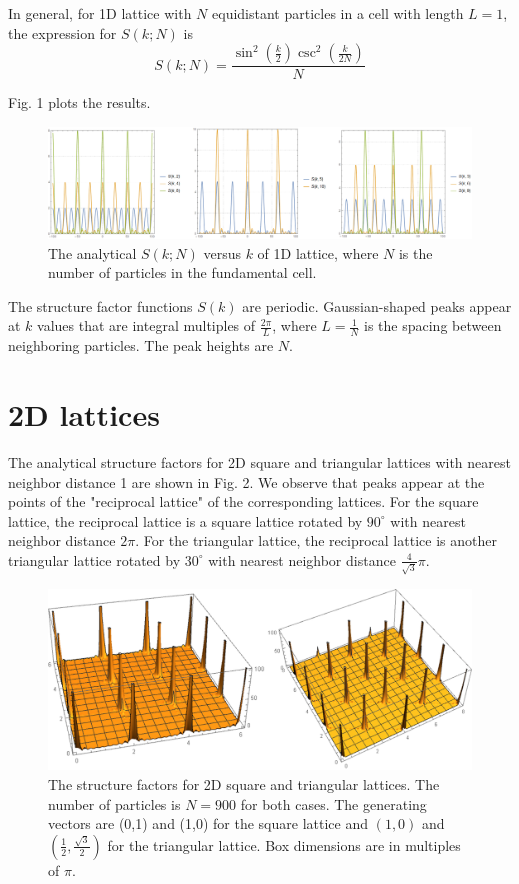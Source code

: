 \documentclass[journal=jacsat,manuscript=article]{achemso}
\begin{document}
	In general, for 1D lattice with $N$ equidistant particles in a cell with length $L=1$, the expression for $S(k;N)$ is
	\begin{equation}
		S(k;N)=\frac{\sin ^2\left(\frac{k}{2}\right) \csc ^2\left(\frac{k}{2 N}\right)}{N}
	\end{equation}
	
	Fig. 1 plots the results. 
	
	\begin{figure}
		\includegraphics[width=1\linewidth]{sk1d}
		\caption{The analytical $S(k;N)$ versus $k$ of 1D lattice, where $N$ is the number of particles in the fundamental cell.}
		\label{fig:sk1d}
	\end{figure}

	The structure factor functions $S(k)$ are periodic. Gaussian-shaped peaks appear at $k$ values that are integral multiples of $\frac{2\pi}{L}$, where $L=\frac{1}{N}$ is the spacing between neighboring particles. The peak heights are $N$.
	 
	\section{2D lattices}
	The analytical structure factors for 2D square and triangular lattices with nearest neighbor distance 1 are shown in Fig. 2. We observe that peaks appear at the points of the "reciprocal lattice" of the corresponding lattices. For the square lattice, the reciprocal lattice is a square lattice rotated by $90^\circ$ with nearest neighbor distance $2\pi$. For the triangular lattice, the reciprocal lattice is another triangular lattice rotated by $30^\circ$ with nearest neighbor distance $\frac{4}{\sqrt{3}}\pi$.
	\begin{figure}
		\centering
		\includegraphics[width=1\linewidth]{lattice2D}
		\caption{The structure factors for 2D square and triangular lattices. The number of particles is $N=900$ for both cases. The generating vectors are (0,1) and (1,0) for the square lattice and $(1,0)$ and $\left(\frac{1}{2},\frac{\sqrt{3}}{2}\right)$ for the triangular lattice. Box dimensions are in multiples of $\pi$.}
		\label{fig:lattice2d}
	\end{figure}
\end{document}
